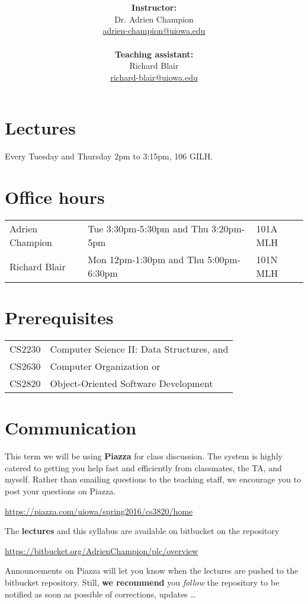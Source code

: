 \documentclass[10pt]{article}
\title{
  \articleTitle
}
\author{
  \begin{minipage}{.5\textwidth}
    \centering
    \textbf{Instructor:}\\
    Dr. Adrien Champion\\
    \href{mailto:adrien-champion@uiowa.edu}{adrien-champion@uiowa.edu}\\[2pt]
  \end{minipage}
  \begin{minipage}{.5\textwidth}
    \centering
    \textbf{Teaching assistant:}\\
    Richard Blair\\
    \href{mailto:richard-blair@uiowa.edu}{richard-blair@uiowa.edu}
  \end{minipage}
}
\date{}
\newcommand{\ita}[1]{\textit{#1}}
\begin{document}
\maketitle

\section*{Lectures}
Every Tuesday and Thursday 2pm to 3:15pm, 106 GILH.


\section*{Office hours}
\begin{tabular}{l | l l}
  Adrien Champion & Tue 3:30pm-5:30pm and Thu 3:20pm-5pm & 101A MLH \\
  Richard Blair & Mon 12pm-1:30pm and Thu 5:00pm-6:30pm & 101N MLH \\
\end{tabular}


\section*{Prerequisites}
\begin{tabular}{l l}
  CS$2230$ & Computer Science II: Data Structures, and \\
  CS$2630$ & Computer Organization or \\
  CS$2820$ & Object-Oriented Software Development
\end{tabular}


\section*{Communication}

This term we will be using \textbf{Piazza} for class discussion. The system is
highly catered to getting you help fast and efficiently from classmates, the
TA, and myself. Rather than emailing questions to the teaching staff, we
encourage you to post your questions on Piazza.

\centerline{
  \url{https://piazza.com/uiowa/spring2016/cs3820/home}
}

\noindent
The \textbf{lectures} and this syllabus are available on bitbucket on the
repository

\centerline{
  \url{https://bitbucket.org/AdrienChampion/plc/overview}
}

\noindent
Announcements on Piazza will let you know when the lectures are pushed to the
bitbucket repository. Still, \textbf{we recommend} you \ita{follow} the
repository to be notified as soon as possible of corrections, updates \ldots
\end{document}
